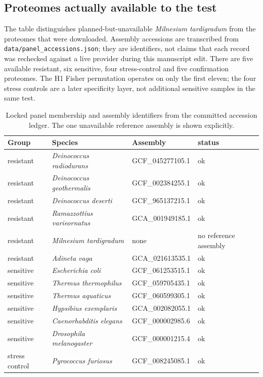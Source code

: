 \subsection{Proteomes actually available to the test}
The table distinguishes planned-but-unavailable \emph{Milnesium tardigradum} from the proteomes that were downloaded. Assembly accessions are transcribed from \texttt{data/panel\_accessions.json}; they are identifiers, not claims that each record was rechecked against a live provider during this manuscript edit. There are five available resistant, six sensitive, four stress-control and five confirmation proteomes. The H1 Fisher permutation operates on only the first eleven; the four stress controls are a later specificity layer, not additional sensitive samples in the same test.
\begin{table}[!htbp]\centering\scriptsize\caption{Locked panel membership and assembly identifiers from the committed accession ledger. The one unavailable reference assembly is shown explicitly.}\begin{tabular}{p{2.2cm}p{5.0cm}p{3.3cm}l}\hline Group & Species & Assembly & status \\\hline
resistant & \emph{Deinococcus radiodurans} & GCF\_045277105.1 & ok \\
resistant & \emph{Deinococcus geothermalis} & GCF\_002384255.1 & ok \\
resistant & \emph{Deinococcus deserti} & GCF\_965137215.1 & ok \\
resistant & \emph{Ramazzottius varieornatus} & GCA\_001949185.1 & ok \\
resistant & \emph{Milnesium tardigradum} & none & no reference assembly \\
resistant & \emph{Adineta vaga} & GCA\_021613535.1 & ok \\
sensitive & \emph{Escherichia coli} & GCF\_061253515.1 & ok \\
sensitive & \emph{Thermus thermophilus} & GCF\_059705435.1 & ok \\
sensitive & \emph{Thermus aquaticus} & GCF\_060599305.1 & ok \\
sensitive & \emph{Hypsibius exemplaris} & GCA\_002082055.1 & ok \\
sensitive & \emph{Caenorhabditis elegans} & GCF\_000002985.6 & ok \\
sensitive & \emph{Drosophila melanogaster} & GCF\_000001215.4 & ok \\
stress control & \emph{Pyrococcus furiosus} & GCF\_008245085.1 & ok \\

\end{tabular}
\end{table}
